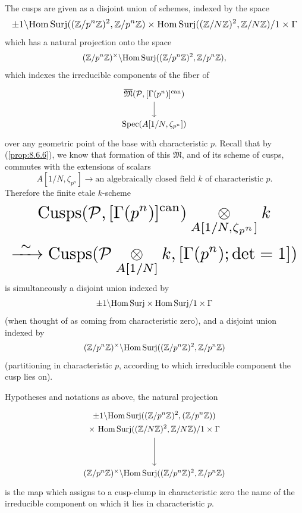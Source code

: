 \kmitem\label{item:13.9.2}The cusps are given as a disjoint union of schemes, indexed by the space
\[
\resizebox{\linewidth}{!}{$\displaystyle
\pm 1 \backslash \HomSurj((\mathbb{Z}/p^n\mathbb{Z})^2, \mathbb{Z}/p^n\mathbb{Z}) \times \HomSurj((\mathbb{Z}/N\mathbb{Z})^2, \mathbb{Z}/N\mathbb{Z})/1 \times \Gamma$}
\]
which has a natural projection onto the space
\[
(\mathbb{Z}/p^n\mathbb{Z})^\times \backslash \mathrm{Hom\,Surj}((\mathbb{Z}/p^n\mathbb{Z})^2, \mathbb{Z}/p^n\mathbb{Z}) ,
\]
which indexes the irreducible components of the fiber of
\[
\begin{tikzcd}[row sep=1.9em]
\overline{\mathfrak{M}}(\mathcal{P}, [\Gamma(p^n)]^{\mathrm{can}}) \arrow[d] \\
\Spec(A[1/N, \zeta_{p^n}])
\end{tikzcd}
\]
over any geometric point of the base with characteristic $p$. Recall that by (\ref{prop:8.6.6}), we know that formation of this $\overline{\mathfrak{M}}$, and of its scheme of cusps, commutes with the extensions of scalars
\[
A[1/N, \zeta_{p^n}] \to \text{an algebraically closed field } k \text{ of characteristic } p .
\]
Therefore the finite etale $k$-scheme
\[
\resizebox{\linewidth}{!}{$\displaystyle
\begin{gathered}
\Cusps(\mathcal{P}, [\Gamma(p^n)]^{\mathrm{can}}) \tens{A[1/N, \zeta_{p^n}]} k \\
\xrightarrow{\ \sim\ } \Cusps(\mathcal{P} \tens{A[1/N]} k, [\Gamma(p^n); \det = 1])
\end{gathered}$}
\]
is simultaneously a disjoint union indexed by
\[
\pm 1 \backslash \mathrm{Hom\,Surj} \times \mathrm{Hom\,Surj}/1 \times \Gamma
\]
(when thought of as coming from characteristic zero), and a disjoint union indexed by
\[
(\mathbb{Z}/p^n\mathbb{Z})^\times \backslash \mathrm{Hom\,Surj}((\mathbb{Z}/p^n\mathbb{Z})^2, \mathbb{Z}/p^n\mathbb{Z})
\]
(partitioning in characteristic $p$, according to which irreducible component the cusp lies on).

\begin{kthm}\label{thm:13.9.3}
Hypotheses and notations as above, the natural projection
\[
\begin{tikzcd}[row sep=3.4em]
\begin{gathered} \pm 1 \backslash \HomSurj((\mathbb{Z}/p^n\mathbb{Z})^2, (\mathbb{Z}/p^n\mathbb{Z})) \\ \times\ \HomSurj((\mathbb{Z}/N\mathbb{Z})^2, \mathbb{Z}/N\mathbb{Z})/1 \times \Gamma \end{gathered} \arrow[d] \\
(\mathbb{Z}/p^n\mathbb{Z})^\times \backslash \HomSurj((\mathbb{Z}/p^n\mathbb{Z})^2, \mathbb{Z}/p^n\mathbb{Z})
\end{tikzcd}
\]
is the map which assigns to a cusp-clump in characteristic zero the name of the irreducible component on which it lies in characteristic $p$.
\end{kthm}

